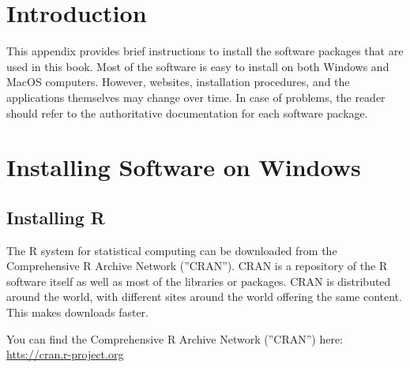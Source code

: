
\section{Introduction}

This appendix provides brief instructions to install the software packages that are used in this book. Most of the software is easy to install on both Windows and MacOS computers. However, websites, installation procedures, and the applications themselves may change over time. In case of problems, the reader should refer to the authoritative documentation for each software package.

\section{Installing Software on Windows}

\subsection{Installing R}

The R system for statistical computing can be downloaded from the Comprehensive R Archive Network (''CRAN''). CRAN is a repository of the R software itself as well as most of the libraries or packages. CRAN is distributed around the world, with different sites around the world offering the same content. This makes downloads faster.

\begin{resourcebox}
You can find the Comprehensive R Archive Network (''CRAN'') here:\\

\vspace{.5\baselineskip}
\url{htts://cran.r-project.org}
\end{resourcebox}

